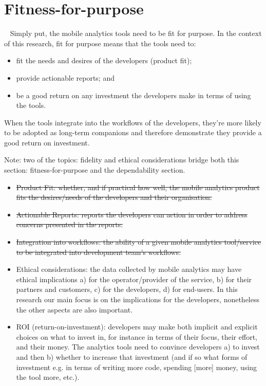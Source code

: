 \section{Fitness-for-purpose}~\label{tata-fitness-for-purpose-section}
Simply put, the mobile analytics tools need to be fit for purpose. In the context of this research, fit for purpose means that the tools need to:

\begin{itemize}
\item fit the needs and desires of the developers (product fit); 
\item provide actionable reports; and 
\item be a good return on any investment the developers make in terms of using the tools.
\end{itemize}
 
When the tools integrate into the workflows of the developers, they're more likely to be adopted as long-term companions and therefore demonstrate they provide a good return on investment. 

Note: two of the topics: fidelity and ethical considerations bridge both this section: fitness-for-purpose and the dependability section.

{\small
\begin{itemize}
    \itemsep0em
    \item \sout{Product Fit: whether, and if practical how well, the mobile analytics product fits the desires/needs of the developers and their organisation.}
    \item \sout{Actionable Reports: reports the developers can action in order to address concerns presented in the reports.}
    \item \sout{Integration into workflows: the ability of a given mobile analytics tool/service to be integrated into development team's workflows.}
    \item Ethical considerations: the data collected by mobile analytics may have ethical implications a) for the operator/provider of the service, b) for their partners and customers, c) for the developers, d) for end-users. In this research our main focus is on the implications for the developers, nonetheless the other aspects are also important.
    \item ROI (return-on-investment): developers may make both implicit and explicit choices on what to invest in, for instance in terms of their focus, their effort, and their money. The analytics tools need to convince developers a) to invest and then b) whether to increase that investment (and if so what forms of investment e.g. in terms of writing more code, spending [more] money, using the tool more, etc.).
\end{itemize}
}

